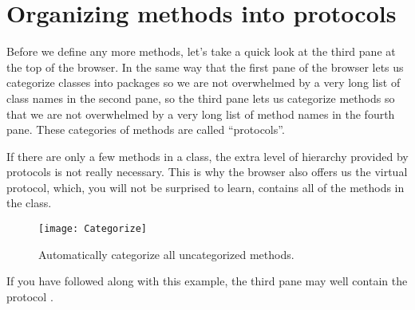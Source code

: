 \documentclass[a4paper,10pt,twoside]{book}
\begin{document}
{%


\section{Organizing methods into protocols}

Before we define any more methods, let's take a quick look at the third pane at the top of the browser.
In the same way that the first pane of the browser lets us categorize classes into packages so we are not overwhelmed by a very long list of class names in the second pane, so the third pane lets us categorize methods so that we are not overwhelmed by a very long list of method names in the fourth pane.   
These categories of methods are called ``protocols''.

If there are only a few methods in a class, the extra level of hierarchy provided by protocols is not really necessary.
This is why the browser also offers us the  virtual protocol, which, you will not be surprised to learn, contains all of the methods in the class.

\begin{figure}[htbp]
   \centering
   \texttt{[image: Categorize]} 
   \caption{Automatically categorize all uncategorized methods.}
\end{figure}

If you have followed along with this example, the third pane may well contain the protocol .

}
\end{document}
